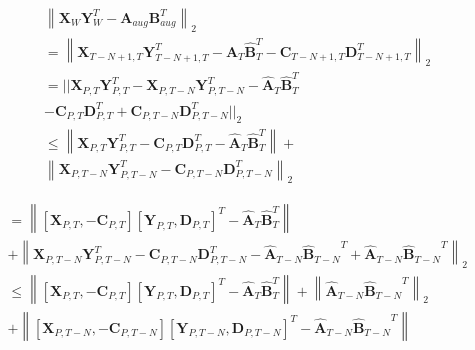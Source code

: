\begin{align}
    & \left\| \boldsymbol{X}_W\boldsymbol{Y}_W^T - \boldsymbol{A}_{aug}\boldsymbol{B}_{aug}^T\right\|_2 \nonumber \\
    & = \left\| \boldsymbol{X}_{T-N+1,T}\boldsymbol{Y}_{T-N+1,T}^T - \hat{\boldsymbol{A}}_T\hat{\boldsymbol{B}}_T^T - \boldsymbol{C}_{T-N+1,T}\boldsymbol{D}_{T-N+1,T}^T\right\|_2 \nonumber \\
    & = || \boldsymbol{X}_{P,T}\boldsymbol{Y}_{P,T}^T - \boldsymbol{X}_{P,T-N}\boldsymbol{Y}_{P,T-N}^T - \hat{\boldsymbol{A}}_T\hat{\boldsymbol{B}}_T^T \nonumber \\
    & - \boldsymbol{C}_{P,T}\boldsymbol{D}_{P,T}^T + \boldsymbol{C}_{P,T-N}\boldsymbol{D}_{P,T-N}^T ||_2 \nonumber \\
    & \leq \left\| \boldsymbol{X}_{P,T}\boldsymbol{Y}_{P,T}^T - \boldsymbol{C}_{P,T}\boldsymbol{D}_{P,T}^T - \hat{\boldsymbol{A}}_T\hat{\boldsymbol{B}}_T^T \right\| + \nonumber \\
    & \left\| \boldsymbol{X}_{P,T-N}\boldsymbol{Y}_{P,T-N}^T - \boldsymbol{C}_{P,T-N}\boldsymbol{D}_{P,T-N}^T \right\|_2 \nonumber
\end{align}

\begin{align}
    & = \left\| [\boldsymbol{X}_{P,T},-\boldsymbol{C}_{P,T}][\boldsymbol{Y}_{P,T},\boldsymbol{D}_{P,T}]^T - \hat{\boldsymbol{A}}_T\hat{\boldsymbol{B}}_T^T \right\| \nonumber \\
    & + \left\| \boldsymbol{X}_{P,T-N}\boldsymbol{Y}_{P,T-N}^T - \boldsymbol{C}_{P,T-N}\boldsymbol{D}_{P,T-N}^T - \hat{\boldsymbol{A}}_{T-N}{\hat{\boldsymbol{B}}_{T-N}}^T + \hat{\boldsymbol{A}}_{T-N}{\hat{\boldsymbol{B}}_{T-N}}^T \right\|_2 \nonumber \\
    & \leq \left\| [\boldsymbol{X}_{P,T},-\boldsymbol{C}_{P,T}][\boldsymbol{Y}_{P,T},\boldsymbol{D}_{P,T}]^T - \hat{\boldsymbol{A}}_T\hat{\boldsymbol{B}}_T^T \right\| + \left\|\hat{\boldsymbol{A}}_{T-N}{\hat{\boldsymbol{B}}_{T-N}}^T \right\|_2 \nonumber \\
    & + \left\| [\boldsymbol{X}_{P,T-N},- \boldsymbol{C}_{P,T-N}][\boldsymbol{Y}_{P,T-N},\boldsymbol{D}_{P,T-N}]^T  - \hat{\boldsymbol{A}}_{T-N}{\hat{\boldsymbol{B}}_{T-N}}^T\right\|  \nonumber \\
\end{align}

